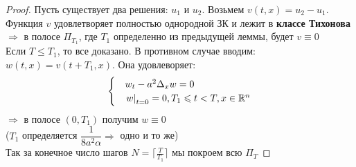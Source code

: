 \begin{itemize}
\begin{theorem}
\begin{proof}
Пусть существует два решения: $u_1$ и $u_2$. Возьмем $v(t,x) = u_2 - u_1$. Функция $v$ удовлетворяет полностью однородной ЗК и лежит в {\bf классе Тихонова} 
$\Rightarrow$ в полосе $\Pi_{T_1}$, где $T_1$ определенно из предыдущей леммы, будет $v\equiv 0$\\
Если $T \leq T_1$, то все доказано. В противном случае вводим:\\
$w(t,x) = v(t+T_1,x)$. Она удовлеворяет:
  \begin{equation}
  \begin{cases}
  & w_t - a^2\Delta_xw=0\\
  &\left. w\right|_{t=0} = 0, T_1 \leqslant t < T,x \in \mathbb{R}^n
  \end{cases}
  \end{equation}
$\Rightarrow$ в полосе $(0,T_1)$ получим $w \equiv 0$\\
($T_1$ определяется $\dfrac{1}{8a^2\alpha} \Rightarrow$ одно и то же)\\
Так за конечное число шагов $N = \lceil{\frac{T}{T_1}} \rceil$ мы покроем всю $\Pi_T$
\end{proof} 
\end{theorem}


\end{itemize}



